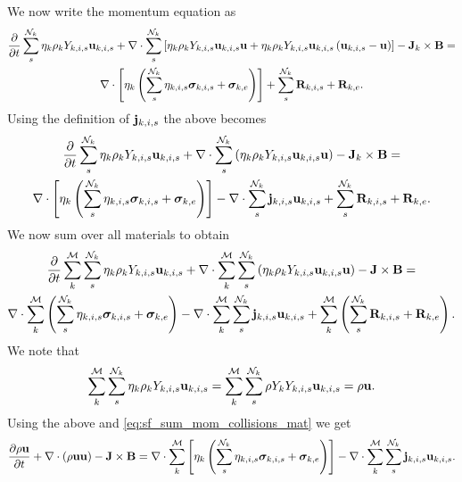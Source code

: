 \documentclass[a4paper,11pt]{report}
\begin{document}
We now write the momentum equation as
\begin{multline*}
    \frac{\partial}{\partial t} \sum_s^{\mathcal{N}_k} \eta_k \rho_k Y_{k,i,s} \mathbf{u}_{k,i,s} + \nabla \cdot \sum_s^{\mathcal{N}_k} \left[ \eta_k \rho_k Y_{k,i,s} \mathbf{u}_{k,i,s} \mathbf{u} + \eta_k \rho_k Y_{k,i,s} \mathbf{u}_{k,i,s} \left( \mathbf{u}_{k,i,s} - \mathbf{u} \right) \right] - \mathbf{J}_k \times \mathbf{B} = \\
    \nabla \cdot \left[ \eta_k \left( \sum_s^{\mathcal{N}_k} \eta_{k,i,s} \bm \sigma_{k,i,s} + \bm \sigma_{k,e} \right) \right] + \sum_s^{\mathcal{N}_k} \mathbf{R}_{k,i,s} + \mathbf{R}_{k,e}.
\end{multline*}
Using the definition of $\mathbf{j}_{k,i,s}$ the above becomes
\begin{multline*}
    \frac{\partial}{\partial t} \sum_s^{\mathcal{N}_k} \eta_k \rho_k Y_{k,i,s} \mathbf{u}_{k,i,s} + \nabla \cdot \sum_s^{\mathcal{N}_k} \left( \eta_k \rho_k Y_{k,i,s} \mathbf{u}_{k,i,s} \mathbf{u}  \right) - \mathbf{J}_k \times \mathbf{B} = \\
    \nabla \cdot \left[ \eta_k \left( \sum_s^{\mathcal{N}_k} \eta_{k,i,s} \bm \sigma_{k,i,s} + \bm \sigma_{k,e} \right) \right] - \nabla \cdot \sum_s^{\mathcal{N}_k} \mathbf{j}_{k,i,s} \mathbf{u}_{k,i,s} + \sum_s^{\mathcal{N}_k} \mathbf{R}_{k,i,s} + \mathbf{R}_{k,e}.
\end{multline*}
We now sum over all materials to obtain
\begin{multline*}
    \frac{\partial}{\partial t} \sum_k^\mathcal{M} \sum_s^{\mathcal{N}_k} \eta_k \rho_k Y_{k,i,s} \mathbf{u}_{k,i,s} + \nabla \cdot \sum_k^\mathcal{M} \sum_s^{\mathcal{N}_k} \left( \eta_k \rho_k Y_{k,i,s} \mathbf{u}_{k,i,s} \mathbf{u}  \right) - \mathbf{J} \times \mathbf{B} = \\
    \nabla \cdot \sum_k^\mathcal{M} \left( \sum_s^{\mathcal{N}_k} \eta_{k,i,s} \bm \sigma_{k,i,s} + \bm \sigma_{k,e} \right) - \nabla \cdot \sum_k^\mathcal{M} \sum_s^{\mathcal{N}_k} \mathbf{j}_{k,i,s} \mathbf{u}_{k,i,s} + \sum_k^\mathcal{M} \left( \sum_s^{\mathcal{N}_k} \mathbf{R}_{k,i,s} + \mathbf{R}_{k,e} \right).
\end{multline*}
We note that
\begin{equation}
    \sum_k^\mathcal{M} \sum_s^{\mathcal{N}_k} \eta_k \rho_k Y_{k,i,s} \mathbf{u}_{k,i,s} =  \sum_k^\mathcal{M} \sum_s^{\mathcal{N}_k} \rho Y_k Y_{k,i,s} \mathbf{u}_{k,i,s} = \rho \mathbf{u}.
\end{equation}
Using the above and \cref{eq:sf_sum_mom_collisions_mat} we get
\begin{equation*}
    \frac{\partial \rho \mathbf{u}}{\partial t} + \nabla \cdot \left( \rho \mathbf{u} \mathbf{u} \right) - \mathbf{J} \times \mathbf{B} = \nabla \cdot \sum_k^\mathcal{M} \left[ \eta_k \left( \sum_s^{\mathcal{N}_k} \eta_{k,i,s} \bm \sigma_{k,i,s} + \bm \sigma_{k,e} \right) \right] - \nabla \cdot \sum_k^\mathcal{M} \sum_s^{\mathcal{N}_k} \mathbf{j}_{k,i,s} \mathbf{u}_{k,i,s}.
\end{equation*}
\end{document}

